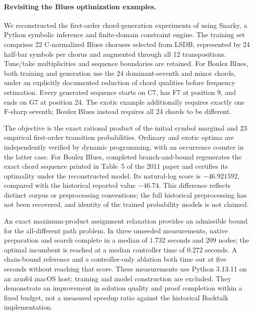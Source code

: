 \paragraph{Revisiting the Blues optimization examples.}
We reconstructed the first-order chord-generation experiments of
\cite{DBLP:journals/constraints/PachetR11} using Snarky, a Python symbolic
inference and finite-domain constraint engine. The training set comprises 22
C-normalized Blues choruses selected from LSDB, represented by 24 half-bar symbols
per chorus and augmented through all 12 transpositions. Tune/take multiplicities
and sequence boundaries are retained. For Boulez Blues, both training and
generation use the 24 dominant-seventh and minor chords, under an explicitly
documented reduction of chord qualities before frequency estimation.
Every generated sequence starts on C7, has F7 at position 9, and ends on G7 at
position 24. The exotic example additionally requires exactly one F-sharp seventh;
Boulez Blues instead requires all 24 chords to be different.

The objective is the exact rational product of the initial symbol marginal and
23 empirical first-order transition probabilities. Ordinary and exotic optima
are independently verified by dynamic programming, with an occurrence counter in
the latter case. For Boulez Blues, completed branch-and-bound regenerates the
exact chord sequence printed in Table~5 of the 2011 paper and certifies its
optimality under the reconstructed model. Its natural-log score is
$-46.921592$, compared with the historical reported value $-46.74$.
This difference reflects distinct corpus or preprocessing conventions; the full
historical preprocessing has not been recovered, and identity of the trained
probability models is not claimed.

An exact maximum-product assignment relaxation provides an admissible bound for
the all-different path problem. In three unseeded measurements, native preparation
and search complete in a median of $1.732$ seconds and 209 nodes; the optimal
incumbent is reached at a median controller time of $0.272$ seconds. A chain-bound
reference and a controller-only ablation both time out at five seconds without
reaching that score. These measurements use Python 3.13.11 on an arm64 macOS host;
training and model construction are excluded. They demonstrate an improvement in
solution quality and proof completion within a fixed budget, not a measured
speedup ratio against the historical Backtalk implementation.

